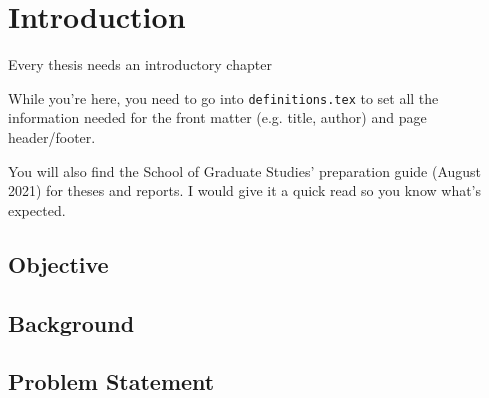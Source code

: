 \chapter{Introduction}

Every thesis needs an introductory chapter

While you're here, you need to go into \texttt{definitions.tex} to set all the 
information needed for the front matter (e.g. title, author) and page 
header/footer.

You will also find the School of Graduate Studies' preparation guide (August 
2021) for theses and reports. I would give it a quick read so you know what's 
expected.

\section{Objective}

\section{Background}

\section{Problem Statement}